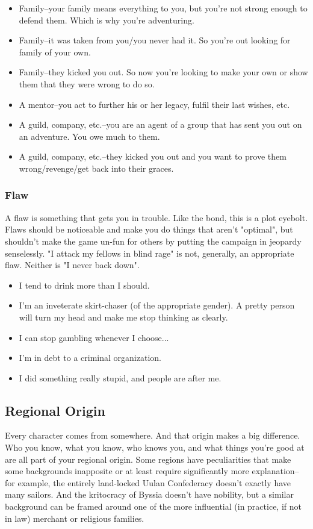 \begin{itemize}
	\item Family--your family means everything to you, but you're not strong enough to defend them. Which is why you're adventuring.
	\item Family--it was taken from you/you never had it. So you're out looking for family of your own.
	\item Family--they kicked you out. So now you're looking to make your own or show them that they were wrong to do so.
	\item A mentor--you act to further his or her legacy, fulfil their last wishes, etc.
	\item A guild, company, etc.--you are an agent of a group that has sent you out on an adventure. You owe much to them.
	\item A guild, company, etc.--they kicked you out and you want to prove them wrong/revenge/get back into their graces.
\end{itemize}

\subsubsection{Flaw}
A flaw is something that gets you in trouble. Like the bond, this is a plot eyebolt. Flaws should be noticeable and make you do things that aren't "optimal", but shouldn't make the game un-fun for others by putting the campaign in jeopardy senselessly. "I attack my fellows in blind rage" is not, generally, an appropriate flaw. Neither is "I never back down".

\begin{itemize}
	\item I tend to drink more than I should.
	\item I'm an inveterate skirt-chaser (of the appropriate gender). A pretty person will turn my head and make me stop thinking as clearly.
	\item I can stop gambling whenever I choose...
	\item I'm in debt to a criminal organization.
	\item I did something really stupid, and people are after me.
\end{itemize}

\subsection{Regional Origin}
Every character comes from somewhere. And that origin makes a big difference. Who you know, what you know, who knows you, and what things you're good at are all part of your regional origin. Some regions have peculiarities that make some backgrounds inapposite or at least require significantly more explanation--for example, the entirely land-locked Uulan Confederacy doesn't exactly have many sailors. And the kritocracy of Byssia doesn't have nobility, but a similar background can be framed around one of the more influential (in practice, if not in law) merchant or religious families.


